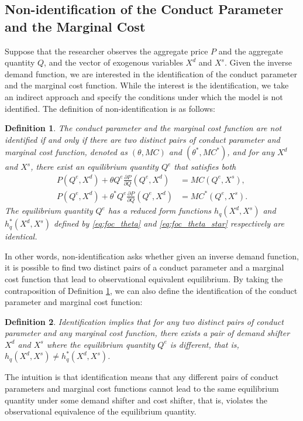 \documentclass[11pt, a4paper]{article}
\newtheorem{definition}{Definition}
\theoremstyle{remark}
\begin{document}
\subsection{Non-identification of the Conduct Parameter and the Marginal Cost}\label{sec:definition_identification}
Suppose that the researcher observes the aggregate price $P$ and the aggregate quantity $Q$, and the vector of exogenous variables $X^{d}$ and $X^{s}$.
Given the inverse demand function, we are interested in the identification of the conduct parameter and the marginal cost function.
While the interest is the identification, we take an indirect approach and specify the conditions under which the model is not identified.
The definition of non-identification is as follows:
\begin{definition}\label{definition:non_identification}
    The conduct parameter and the marginal cost function are not identified if and only if 
    there are two distinct pairs of conduct parameter and marginal cost function, denoted as $(\theta, MC)$ and $(\theta^{*}, MC^{*})$, and for any $X^{d}$ and $X^{s}$, there exist an equilibrium quantity $Q^e$ that satisfies both
    \begin{align}
    P(Q^e, X^{d}) + \theta Q^e\frac{\partial P}{\partial Q}(Q^e, X^{d}) & = MC(Q^e, X^{s}) ,  \label{eq:foc_theta}\\
    P(Q^e, X^{d}) + \theta^{*} Q^e\frac{\partial P}{\partial Q}(Q^e, X^{d}) & = MC^{*}(Q^e, X^{s}).\label{eq:foc_theta_star}
    \end{align}
    The equilibrium quantity $Q^e$ has a reduced form functions $h_q(X^{d}, X^{s})$ and $h_q^{*}(X^{d}, X^{s})$ defined by \eqref{eq:foc_theta} and \eqref{eq:foc_theta_star} respectively are identical.
\end{definition}
In other words, non-identification asks whether given an inverse demand function, it is possible to find two distinct pairs of a conduct parameter and a marginal cost function that lead to observational equivalent equilibrium.
By taking the contraposition of Definition \ref{definition:non_identification}, we can also define the identification of the conduct parameter and marginal cost function:
\begin{definition}\label{definition:identification}
    Identification implies that for any two distinct pairs of conduct parameter and any marginal cost function, there exists a pair of demand shifter $X^{d}$ and $X^{s}$ where the equilibrium quantity $Q^e$ is different, that is, $h_q(X^{d}, X^{s}) \ne h_q^{*}(X^{d}, X^{s})$.
\end{definition}
The intuition is that identification means that any different pairs of conduct parameters and marginal cost functions cannot lead to the same equilibrium quantity under some demand shifter and cost shifter, that is, violates the observational equivalence of the equilibrium quantity.
\end{document}

